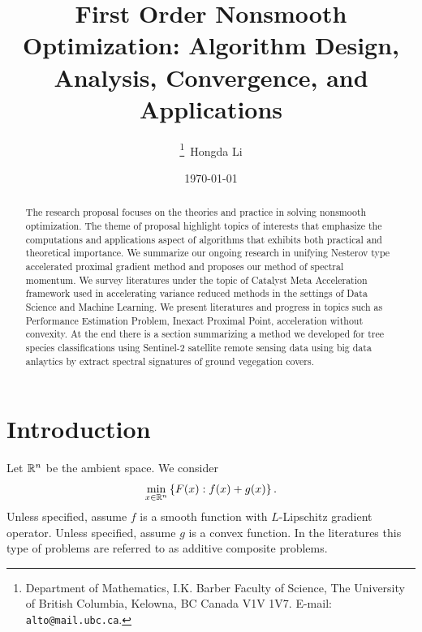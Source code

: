 \documentclass[12pt]{article}
\begin{document}
\title{
    {
        \selectfont 
        First Order Nonsmooth Optimization: 
        Algorithm Design, Analysis, Convergence, and Applications
    }
    }

\author{
    \thanks{Department of Mathematics, I.K. Barber Faculty of Science,
    The University of British Columbia, Kelowna, BC Canada V1V 1V7. 
    E-mail:  \texttt{alto@mail.ubc.ca}.}~Hongda Li
}

\date{\today}

\maketitle


\begin{abstract} 
    \noindent
    The research proposal focuses on the theories and practice in solving nonsmooth optimization. 
    The theme of proposal highlight topics of interests that emphasize the computations and applications aspect of algorithms that exhibits both practical and theoretical importance. 
    We summarize our ongoing research in unifying Nesterov type accelerated proximal gradient method and proposes our method of spectral momentum. 
    We survey literatures under the topic of Catalyst Meta Acceleration framework used in accelerating variance reduced methods in the settings of Data Science and Machine Learning. 
    We present literatures and progress in topics such as Performance Estimation Problem, Inexact Proximal Point, acceleration without convexity. 
    At the end there is a section summarizing a method we developed for tree species classifications using Sentinel-2 satellite remote sensing data using big data anlaytics by extract spectral signatures of ground vegegation covers. 


\end{abstract}


\tableofcontents

\section{Introduction}
    Let $\mathbb R^n$ be the ambient space. We consider 
    \begin{align}
        \min_{x \in \mathbb R^n} \left\lbrace
            F(x): f(x) + g(x)
        \right\rbrace.
    \end{align}\label{eqn:additive-comp-obj}
    Unless specified, assume $f$ is a smooth function with $L$-Lipschitz gradient operator. 
    Unless specified, assume $g$ is a convex function. 
    In the literatures this type of problems are referred to as additive composite problems. 
\end{document}
